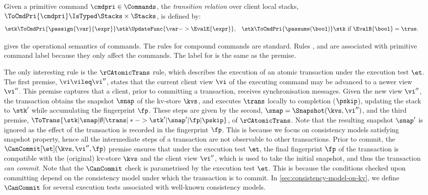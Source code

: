 \begin{definition}
Given a primitive command \( \cmdpri \in \Commands\), 
the \emph{transition relation} over client local stacks,
\( \ToCmdPri{\cmdpri} \IsTyped \Stacks \times \Stacks \),
is defined by:
\begin{align*}
  \stk & \ToCmdPri{\passign{\var}{\expr}} \stk\UpdateFunc{\var -> \EvalE{\expr}} ,
       & \stk & \ToCmdPri{\passume(\bool)} \stk \ \text{if} \ \EvalB{\bool}= \true .
\end{align*}
\end{definition}

 gives the operational semantics of commands.
The rules for compound commands are standard.
Rules \rCChoice, \rCIter and \rCSeqSkip are associated with primitive command label \lbPri
because they only affect the commands.
The label for \rCSeq is the same as the premise.

The only interesting rule is  the \(\rCAtomicTrans\) rule,
which describes the execution of an atomic transaction under the execution test \(\et\). 
The first premise, \( \vi \vileq \vi'' \), states that the current client view \(\vi\)
of the executing command may be advanced to a newer view \(\vi''\).
This premise captures that a client, prior to committing a transaction, receives synchronisation messages.
Given the new view \(\vi''\), the transaction obtains the snapshot \(\snap\) of the kv-store \(\kvs\), 
and executes \(\trans\) locally to completion (\(\pskip\)), 
updating the stack to \(\stk'\) while accumulating the fingerprint \(\fp\).
These steps are given by the second, \( \snap = \Snapshot(\kvs,\vi'') \),
and the third premise,
\( \ToTrans{\stk | \snap | \emptyset| \trans  | *
        -> \stk' | \snap' | \fp | \pskip }  \), of \( \rCAtomicTrans \).
Note that the resulting snapshot \( \snap' \) is ignored 
as the effect of the transaction is recorded in the fingerprint \(\fp\). 
This is because we focus on consistency models satisfying snapshot property,
hence all the intermediate steps of a transaction are not observable to other transactions.
Prior to commit, the \(\CanCommit[\et](\kvs,\vi'',\fp)\) premise ensures that under the execution test \(\et\), 
the final fingerprint \(\fp\) of the transaction is compatible with the (original) kv-store
\(\kvs\) and the client view \(\vi''\), which is used to take the initial snapshot,
and thus the transaction \emph{can commit}. 
Note that the \(\CanCommit\) check is parametrised by the execution test \(\et\).
This is because the conditions checked upon committing 
depend on the consistency model under which the transaction is to commit. 
In \cref{sec:consistency-model-on-kv}, we define \( \CanCommit \)
for several execution tests associated with well-known consistency models.

